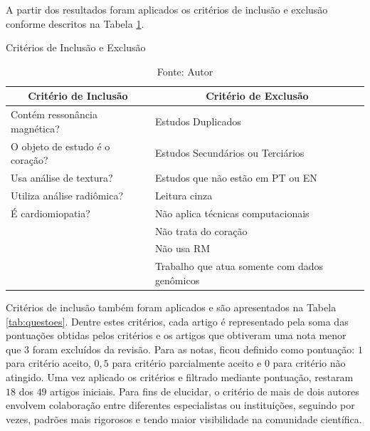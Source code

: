 A partir dos resultados foram aplicados os critérios de inclusão e exclusão conforme descritos na Tabela \ref{tab:criterios}.

\begin{table}[hbtp]
    \centering
    \caption{Critérios de Inclusão e Exclusão}
    \renewcommand{\arraystretch}{1.4} %
    \begin{tabular}{|l|l|}
    \hline 
          \multicolumn{1}{|c|}{\textbf{Critério de Inclusão}} & \multicolumn{1}{c|}{\textbf{Critério de Exclusão}}  \\ 
    \hline 
        \quad Contém ressonância magnética? & \quad Estudos Duplicados   \\ 
        \quad O objeto de estudo é o coração? & \quad Estudos Secundários ou Terciários \\
        \quad Usa análise de textura? & \quad Estudos que não estão em PT ou EN\\
        \quad Utiliza análise radiômica? & \quad Leitura cinza  \\
        \quad É cardiomiopatia? & \quad Não aplica técnicas computacionais\\
        & \quad Não trata do coração \\
        & \quad Não usa RM \\
        & \quad Trabalho que atua somente com dados genômicos \\ 
    \hline 
    \end{tabular} 
    \caption*{Fonte: Autor}
    \label{tab:criterios}
\end{table}

Critérios de inclusão também foram aplicados e são apresentados na Tabela \ref{tab:questoes}. Dentre estes critérios, cada artigo é representado pela soma das pontuações obtidas pelos critérios e os artigos que obtiveram uma nota menor que 3 foram excluídos da revisão. Para as notas, ficou definido como pontuação: $1$ para critério aceito, $0,5$ para critério parcialmente aceito e $0$ para critério não atingido. Uma vez aplicado os critérios e filtrado mediante pontuação, restaram $18$ dos $49$ artigos iniciais. Para fins de elucidar, o critério de mais de dois autores envolvem colaboração entre diferentes especialistas ou instituições, seguindo por vezes, padrões mais rigorosos e tendo maior visibilidade na comunidade científica.


